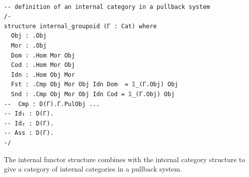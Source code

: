 \documentclass{book}
\theoremstyle{definition}
\newcounter{lcounter}
\begin{document}
\begin{center}
\begin{tcolorbox}[width=5in,colback={white},title={\begin{center}\texttt{Lean \thelcounter} \addtocounter{lcounter}{1}  \end{center}},colbacktitle=Blue,coltitle=black]
\begin{verbatim}

-- definition of an internal category in a pullback system
/-
structure internal_groupoid (Γ : Cat) where
  Obj : .Obj
  Mor : .Obj
  Dom : .Hom Mor Obj
  Cod : .Hom Mor Obj
  Idn : .Hom Obj Mor
  Fst : .Cmp Obj Mor Obj Idn Dom  = 𝟙_(Γ.Obj) Obj
  Snd : .Cmp Obj Mor Obj Idn Cod = 𝟙_(Γ.Obj) Obj
--  Cmp : D(Γ).Γ.PulObj ...
-- Id₁ : D(Γ).
-- Id₂ : D(Γ).
-- Ass : D(Γ).
-/

\end{verbatim}
\end{tcolorbox}
\end{center}

The internal functor structure combines with the internal category structure to give a category of internal categories in a pullback system.\\
\end{document}
